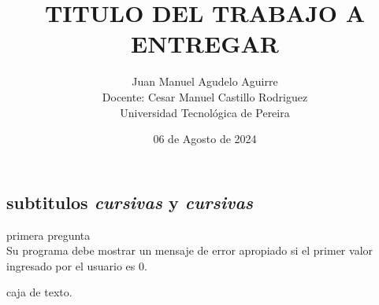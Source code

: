 \documentclass[12pt]{article}
\newenvironment{question}[2][Pregunta]{\begin{trivlist}
\item[\hskip \labelsep {\bfseries #1}\hskip \labelsep {\bfseries #2.}]}{\end{trivlist}}
\begin{document}
 
 
\title{TITULO DEL TRABAJO A ENTREGAR}
\author{Juan Manuel Agudelo Aguirre\\ %
Docente: Cesar Manuel Castillo Rodriguez\\
Universidad Tecnológica de Pereira}
\date{06 de Agosto de 2024}

\maketitle



\begin{center}
\section*{subtitulos \textit{cursivas} y \textit{cursivas}}    
\end{center}

 
\begin{question}{1}
primera pregunta\\

Su programa debe mostrar un mensaje de error apropiado si el primer valor ingresado por el usuario es 0.


\begin{tcolorbox}
caja de texto.
\end{tcolorbox}

\end{question}
\end{document}

